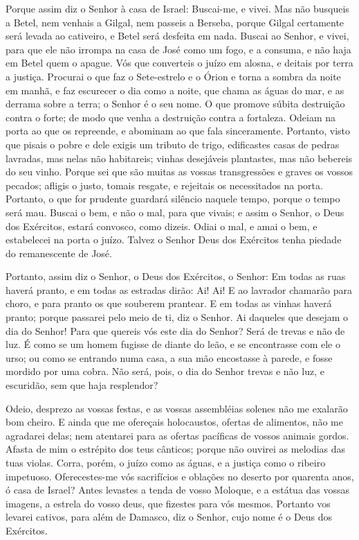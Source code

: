 Porque assim diz o Senhor à casa de Israel: Buscai-me, e vivei.
Mas não busqueis a Betel, nem venhais a Gilgal, nem passeis a
Berseba, porque Gilgal certamente será levada ao cativeiro, e Betel
será desfeita em nada. Buscai ao Senhor, e vivei, para que ele
não irrompa na casa de José como um fogo, e a consuma, e não haja em
Betel quem o apague. Vós que converteis o juízo em alosna, e
deitais por terra a justiça. Procurai o que faz o Sete-estrelo e
o Órion e torna a sombra da noite em manhã, e faz escurecer o dia
como a noite, que chama as águas do mar, e as derrama sobre a terra;
o Senhor é o seu nome. O que promove súbita destruição contra o
forte; de modo que venha a destruição contra a fortaleza.
Odeiam na porta ao que os repreende, e abominam ao que fala
sinceramente. Portanto, visto que pisais o pobre e dele
exigis um tributo de trigo, edificastes casas de pedras lavradas,
mas nelas não habitareis; vinhas desejáveis plantastes, mas não
bebereis do seu vinho. Porque sei que são muitas as vossas
transgressões e graves os vossos pecados; afligis o justo, tomais
resgate, e rejeitais os necessitados na porta. Portanto, o
que for prudente guardará silêncio naquele tempo, porque o tempo
será mau. Buscai o bem, e não o mal, para que vivais; e assim
o Senhor, o Deus dos Exércitos, estará convosco, como dizeis.
Odiai o mal, e amai o bem, e estabelecei na porta o juízo.
Talvez o Senhor Deus dos Exércitos tenha piedade do remanescente de
José.

Portanto, assim diz o Senhor, o Deus dos Exércitos, o Senhor: Em
todas as ruas haverá pranto, e em todas as estradas dirão: Ai! Ai! E
ao lavrador chamarão para choro, e para pranto os que souberem
prantear. E em todas as vinhas haverá pranto; porque passarei
pelo meio de ti, diz o Senhor. Ai daqueles que desejam o dia
do Senhor! Para que quereis vós este dia do Senhor? Será de trevas e
não de luz. É como se um homem fugisse de diante do leão, e
se encontrasse com ele o urso; ou como se entrando numa casa, a sua
mão encostasse à parede, e fosse mordido por uma cobra. Não
será, pois, o dia do Senhor trevas e não luz, e escuridão, sem que
haja resplendor?

Odeio, desprezo as vossas festas, e as vossas assembléias solenes
não me exalarão bom cheiro. E ainda que me ofereçais
holocaustos, ofertas de alimentos, não me agradarei delas; nem
atentarei para as ofertas pacíficas de vossos animais gordos.
Afasta de mim o estrépito dos teus cânticos; porque não
ouvirei as melodias das tuas violas. Corra, porém, o juízo
como as águas, e a justiça como o ribeiro impetuoso.
Oferecestes-me vós sacrifícios e oblações no deserto por
quarenta anos, ó casa de Israel? Antes levastes a tenda de
vosso Moloque, e a estátua das vossas imagens, a estrela do vosso
deus, que fizestes para vós mesmos. Portanto vos levarei
cativos, para além de Damasco, diz o Senhor, cujo nome é o Deus dos
Exércitos.

